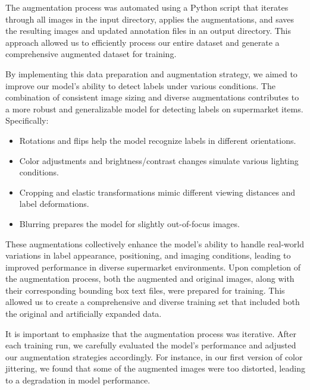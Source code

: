 The augmentation process was automated using a Python script that iterates through all images in the input directory, applies the augmentations, and saves the resulting images and updated annotation files in an output directory. This approach allowed us to efficiently process our entire dataset and generate a comprehensive augmented dataset for training.

By implementing this data preparation and augmentation strategy, we aimed to improve our model's ability to detect labels under various conditions. The combination of consistent image sizing and diverse augmentations contributes to a more robust and generalizable model for detecting labels on supermarket items. Specifically:

\begin{itemize}
    \item Rotations and flips help the model recognize labels in different orientations.
    \item Color adjustments and brightness/contrast changes simulate various lighting conditions.
    \item Cropping and elastic transformations mimic different viewing distances and label deformations.
    \item Blurring prepares the model for slightly out-of-focus images.
\end{itemize}

These augmentations collectively enhance the model's ability to handle real-world variations in label appearance, positioning, and imaging conditions, leading to improved performance in diverse supermarket environments. Upon completion of the augmentation process, both the augmented and original images, along with their corresponding bounding box text files, were prepared for training. This allowed us to create a comprehensive and diverse training set that included both the original and artificially expanded data.

It is important to emphasize that the augmentation process was iterative. After each training run, we carefully evaluated the model's performance and adjusted our augmentation strategies accordingly. For instance, in our first version of color jittering, we found that some of the augmented images were too distorted, leading to a degradation in model performance.



\newpage

